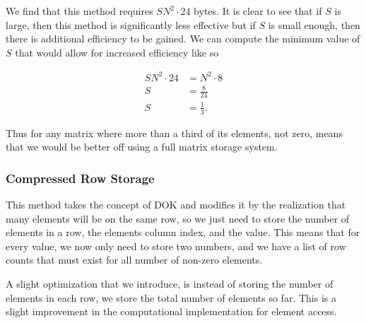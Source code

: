 \documentclass[../fem.tex]{subfiles}
\begin{document}
We find that this method requires $SN^2\cdot24$ bytes. It is clear to see that
if $S$ is large, then this method is significantly less effective but if $S$ is
small enough, then there is additional efficiency to be gained. We can compute
the minimum value of $S$ that would allow for increased efficiency like so

\begin{align*}
  SN^2\cdot24&=N^2\cdot8\\
  S&=\frac{8}{24}\\
  S&=\frac{1}{3}.
\end{align*}

Thus for any matrix where more than a third of its elements, not zero, means
that we would be better off using a full matrix storage system.

\begin{Figure}
  \begin{center}
  \end{center}
  \label{fig:mat_dok}
\end{Figure}

\subsubsection{Compressed Row Storage}%
\label{ssub:compressed_row_storage}

This method takes the concept of DOK and modifies it by the realization that
many elements will be on the same row, so we just need to store the number of
elements in a row, the elements column index, and the value. This means that
for every value, we now only need to store two numbers, and we have a list of
row counts that must exist for all number of non-zero elements.

A slight optimization that we introduce, is instead of storing the number of
elements in each row, we store the total number of elements so far. This is a
slight improvement in the computational implementation for element access.
\end{document}
